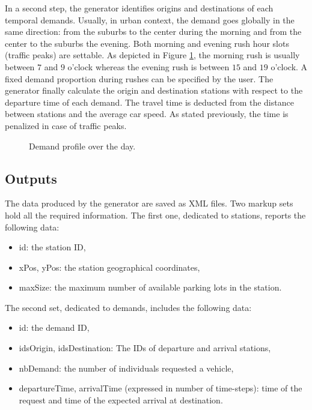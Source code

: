 \medskip
In a second step, the generator identifies origins and destinations of each temporal demands.
Usually, in urban context, the demand goes globally in the same direction: from the suburbs to the center during the morning and from the center to the suburbs the evening.
Both morning and evening rush hour slots (traffic peaks) are settable.
As depicted in Figure \ref{fig:plotDemandProfile}, the morning rush is usually between $7$ and $9$ o'clock whereas the evening rush is between $15$ and $19$ o'clock.
A fixed demand proportion during rushes can be specified by the user.
The generator finally calculate the origin and destination stations with respect to the departure time of each demand.
The travel time is deducted from the distance between stations and the average car speed.
As stated previously, the time is penalized in case of traffic peaks.


\begin{figure}[t]
\centering

\caption{Demand profile over the day.}
\label{fig:plotDemandProfile}
\end{figure}


\subsection{Outputs}

The data produced by the generator are saved as XML files.
Two markup sets hold all the required information.
The first one, dedicated to stations, reports the following data:
\begin{itemize}
\item id: the station ID,
\item xPos, yPos: the station geographical coordinates,
\item maxSize: the maximum number of available parking lots in the station.
\end{itemize}
The second set, dedicated to demands, includes the following data: 
\begin{itemize}
\item id: the demand ID,
\item idsOrigin, idsDestination: The IDs of departure and arrival stations,
\item nbDemand: the number of individuals requested a vehicle,
\item departureTime, arrivalTime (expressed in number of time-steps): time of the request and time of the expected arrival at destination.
\end{itemize}

